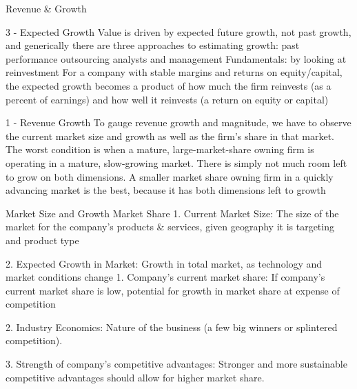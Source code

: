 \documentclass[10pt]{article}
\begin{document}
    \begin{core}{Revenue \& Growth}

      3 - Expected Growth
      Value is driven by expected future growth, not past growth, and generically there are three approaches to estimating growth:
      past performance
      outsourcing analysts and management
      Fundamentals: by looking at reinvestment
      For a company with stable margins and returns on equity/capital, the expected growth becomes a product of how much the firm reinvests (as a percent of earnings) and how well it reinvests (a return on equity or capital)

      1 - Revenue Growth
      To gauge revenue growth and magnitude, we have to observe the current market size and growth as well as the firm’s share in that market.
      The worst condition is when a mature, large-market-share owning firm is operating in a mature, slow-growing market. There is simply not much room left to grow on both dimensions.
      A smaller market share owning firm in a quickly advancing market is the best, because it has both dimensions left to growth

      Market Size and Growth
      Market Share
      1. Current Market Size: The size of the market for the company’s products & services, given geography it is targeting and product type

      2. Expected Growth in Market: Growth in total market, as technology and market conditions change
      1. Company’s current market share: If company’s current market share is low, potential for growth in market share at expense of competition

      2. Industry Economics: Nature of the business (a few big winners or splintered competition).

      3. Strength of company’s competitive advantages: Stronger and more sustainable competitive advantages should allow for higher market share.

    \end{core}
\end{document}
